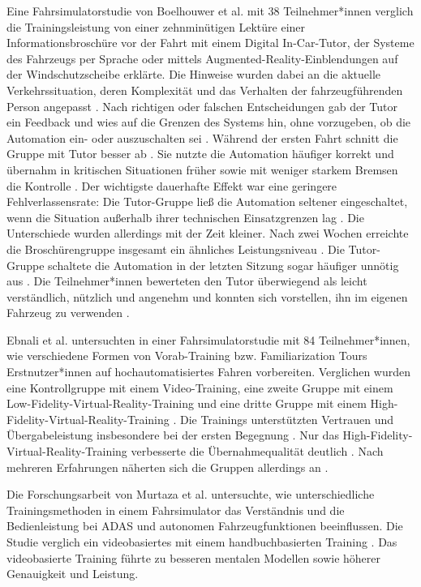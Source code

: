 Eine Fahrsimulatorstudie von Boelhouwer et al. \cite{Boelhouwer2020} mit 38 Teilnehmer*innen verglich die Trainingsleistung von einer zehnminütigen Lektüre einer Informationsbroschüre vor der Fahrt mit einem Digital In-Car-Tutor, der Systeme des Fahrzeugs per Sprache oder mittels Augmented-Reality-Einblendungen auf der Windschutzscheibe erklärte. Die Hinweise wurden dabei an die aktuelle Verkehrssituation, deren Komplexität und das Verhalten der fahrzeugführenden Person angepasst \cite{Boelhouwer2020}. Nach richtigen oder falschen Entscheidungen gab der Tutor ein Feedback und wies auf die Grenzen des Systems hin, ohne vorzugeben, ob die Automation ein- oder auszuschalten sei \cite{Boelhouwer2020}. Während der ersten Fahrt schnitt die Gruppe mit Tutor besser ab \cite{Boelhouwer2020}. Sie nutzte die Automation häufiger korrekt und übernahm in kritischen Situationen früher sowie mit weniger starkem Bremsen die Kontrolle \cite{Boelhouwer2020}. Der wichtigste dauerhafte Effekt war eine geringere Fehlverlassensrate: Die Tutor-Gruppe ließ die Automation seltener eingeschaltet, wenn die Situation außerhalb ihrer technischen Einsatzgrenzen lag \cite{Boelhouwer2020}. Die Unterschiede wurden allerdings mit der Zeit kleiner. Nach zwei Wochen erreichte die Broschürengruppe insgesamt ein ähnliches Leistungsniveau \cite{Boelhouwer2020}. Die Tutor-Gruppe schaltete die Automation in der letzten Sitzung sogar häufiger unnötig aus \cite{Boelhouwer2020}. Die Teilnehmer*innen bewerteten den Tutor überwiegend als leicht verständlich, nützlich und angenehm und konnten sich vorstellen, ihn im eigenen Fahrzeug zu verwenden \cite{Boelhouwer2020}.

Ebnali et al. \cite{ebnali2020familiarization} untersuchten in einer Fahrsimulatorstudie mit 84 Teilnehmer*innen, wie verschiedene Formen von Vorab-Training bzw. Familiarization Tours Erstnutzer*innen auf hochautomatisiertes Fahren vorbereiten. Verglichen wurden eine Kontrollgruppe mit einem Video-Training, eine zweite Gruppe mit einem Low-Fidelity-Virtual-Reality-Training und eine dritte Gruppe mit einem High-Fidelity-Virtual-Reality-Training \cite{ebnali2020familiarization}. Die Trainings unterstützten Vertrauen und Übergabeleistung insbesondere bei der ersten Begegnung \cite{ebnali2020familiarization}. Nur das High-Fidelity-Virtual-Reality-Training verbesserte die Übernahmequalität deutlich \cite{ebnali2020familiarization}. Nach mehreren Erfahrungen näherten sich die Gruppen allerdings an \cite{ebnali2020familiarization}.

Die Forschungsarbeit von Murtaza et al. \cite{murtaza2024assessing} untersuchte, wie unterschiedliche Trainingsmethoden in einem Fahrsimulator das Verständnis und die Bedienleistung bei ADAS und autonomen Fahrzeugfunktionen beeinflussen. Die Studie verglich ein videobasiertes mit einem handbuchbasierten Training \cite{murtaza2024assessing}. Das videobasierte Training führte zu besseren mentalen Modellen sowie höherer Genauigkeit und Leistung.

